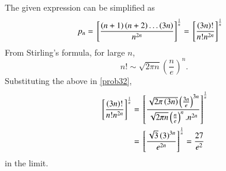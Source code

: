 The given expression can be simplified as
%
\begin{align}
\label{prob32}
p_n = {}\left[\frac{\left(n+1\right)\left(n+2\right)\dots \left(3n\right)}{n^{2n}}\right]^{\frac{1}{n}} & = {}\left[\frac{\left(3n\right)!}{n!n^{2n}}\right]^{\frac{1}{n}}
\end{align}
%
From Stirling's formula, for large $n$,
%
\begin{equation}
 n!\sim {\sqrt {2\pi n}}\left({\frac {n}{e}}\right)^{n}.
\end{equation}
%
Substituting the above in \eqref{prob32},
%
\begin{align}
{}\left[\frac{\left(3n\right)!}{n!n^{2n}}\right]^{\frac{1}{n}} & = {}\left[\frac{{\sqrt {2\pi \left(3n\right)}}\left({\frac {3n}{e}}\right)^{3n}}{{\sqrt {2\pi n}}\left({\frac {n}{e}}\right)^{n}.n^{2n}}\right]^{\frac{1}{n}}
\\
&= {}\left[\frac{\sqrt{3}\left(3\right)^{3n}}{e^{2n}}\right]^{\frac{1}{n}} = \frac{27}{e^2}
\end{align}
%
in the limit.
